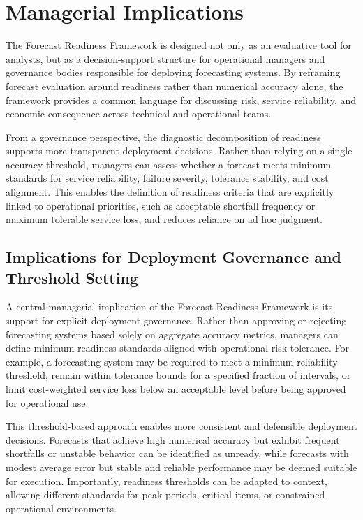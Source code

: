\section{Managerial Implications}

The Forecast Readiness Framework is designed not only as an evaluative tool for analysts, but
as a decision-support structure for operational managers and governance bodies responsible
for deploying forecasting systems. By reframing forecast evaluation around readiness rather
than numerical accuracy alone, the framework provides a common language for discussing
risk, service reliability, and economic consequence across technical and operational teams.

From a governance perspective, the diagnostic decomposition of readiness supports more
transparent deployment decisions. Rather than relying on a single accuracy threshold, managers
can assess whether a forecast meets minimum standards for service reliability, failure severity,
tolerance stability, and cost alignment. This enables the definition of readiness criteria that are
explicitly linked to operational priorities, such as acceptable shortfall frequency or maximum
tolerable service loss, and reduces reliance on ad hoc judgment.

\subsection{Implications for Deployment Governance and Threshold Setting}

A central managerial implication of the Forecast Readiness Framework is its support for
explicit deployment governance. Rather than approving or rejecting forecasting systems
based solely on aggregate accuracy metrics, managers can define minimum readiness standards
aligned with operational risk tolerance. For example, a forecasting system may be required to
meet a minimum reliability threshold, remain within tolerance bounds for a specified fraction
of intervals, or limit cost-weighted service loss below an acceptable level before being approved
for operational use.

This threshold-based approach enables more consistent and defensible deployment decisions.
Forecasts that achieve high numerical accuracy but exhibit frequent shortfalls or unstable
behavior can be identified as unready, while forecasts with modest average error but stable
and reliable performance may be deemed suitable for execution. Importantly, readiness
thresholds can be adapted to context, allowing different standards for peak periods,
critical items, or constrained operational environments.

